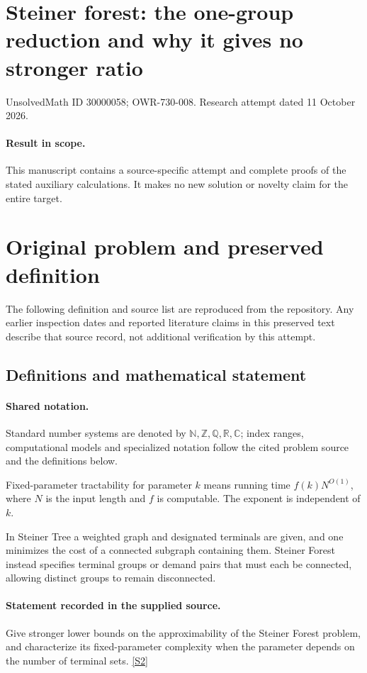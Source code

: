 \documentclass[11pt]{article}
\begin{document}
\section*{Steiner forest: the one-group reduction and why it gives no stronger ratio}
\noindent UnsolvedMath ID 30000058; OWR-730-008. Research attempt dated 11 October 2026.
\paragraph{Result in scope.}This manuscript contains a source-specific attempt and complete proofs of the stated auxiliary calculations. It makes no new solution or novelty claim for the entire target.
\section{Original problem and preserved definition}
The following definition and source list are reproduced from the repository. Any earlier inspection dates and reported literature claims in this preserved text describe that source record, not additional verification by this attempt.
\subsection{Definitions and mathematical statement}

\paragraph{Shared notation.}Standard number systems are denoted by $\mathbb N,\mathbb Z,\mathbb Q,\mathbb R,\mathbb C$; index ranges, computational models and specialized notation follow the cited problem source and the definitions below.


Fixed-parameter tractability for parameter $k$ means running time $f(k)N^{O(1)}$, where $N$ is the input length and $f$ is computable. The exponent is independent of $k$.

In Steiner Tree a weighted graph and designated terminals are given, and one minimizes the cost of a connected subgraph containing them. Steiner Forest instead specifies terminal groups or demand pairs that must each be connected, allowing distinct groups to remain disconnected.
\paragraph{Statement recorded in the supplied source.}
Give stronger lower bounds on the approximability of the Steiner Forest problem, and characterize its fixed-parameter complexity when the parameter depends on the number of terminal sets. \href{https://doi.org/10.4171/owr/2004/28}{[S2]}
\end{document}
